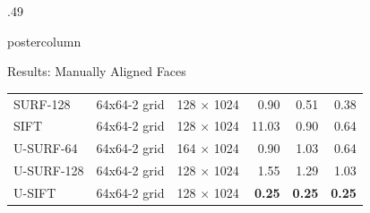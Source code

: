 \documentclass[final,hyperref={pdfpagelabels=false}]{beamer}
\newcommand{\pphantom}{\textcolor{ta3aluminium}} %
\begin{document}
\begin{frame}
\begin{columns}
\begin{column}{.49\textwidth}
\begin{beamercolorbox}[center,wd=\textwidth]{postercolumn}
\begin{minipage}[T]{.95\textwidth}
{\begin{block}{Results: Manually Aligned Faces}
\begin{table}
\begin{tabular}{@{} p{.2\linewidth} p{.18\linewidth} p{.25\linewidth} r r r @{}}
                  SURF-128   & 64x64-2 grid       & 128 $\times$ 1024                                    & 0.90      &  0.51   & 0.38       \\
                  SIFT       & 64x64-2 grid       & 128 $\times$ 1024                                    & 11.03     &  0.90   & 0.64       \\
                  \addlinespace
                  U-SURF-64  & 64x64-2 grid       & \pphantom{1}64 $\times$ 1024                          & 0.90      &  1.03   & 0.64      \\ 
                  U-SURF-128 & 64x64-2 grid       & 128 $\times$ 1024                                    & 1.55      &  1.29   & 1.03       \\ 
                  U-SIFT     & 64x64-2 grid       & 128 $\times$ 1024                                    & \textbf{0.25}  &  \textbf{0.25}   & \textbf{0.25}  \\
                  \bottomrule
                \end{tabular}
              \end{table}


\end{block}}
\end{minipage}
\end{beamercolorbox}
\end{column}
\end{columns}
\end{frame}
\end{document}
